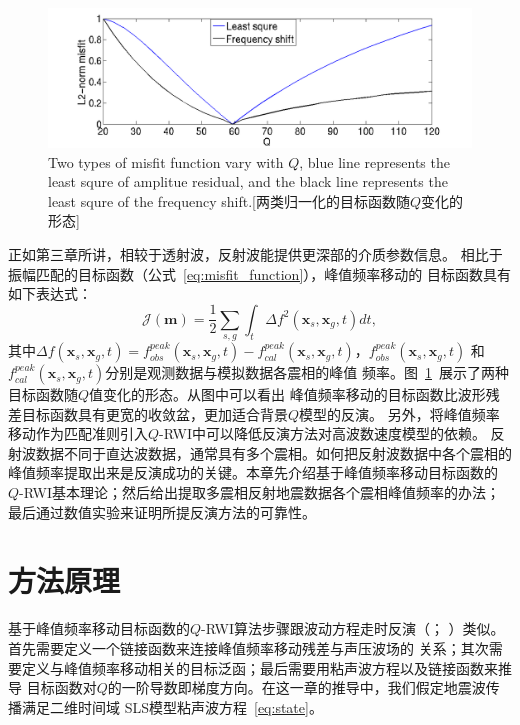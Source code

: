 \begin{figure}[!htbp]
    \centering
    {\includegraphics[width=0.92\linewidth]{figure/misfit_com}}
	{Two types of misfit function vary with $Q$, blue line represents the least 
	squre of amplitue residual, and the black line represents the least squre of 
	the frequency shift.}[两类归一化的目标函数随$Q$变化的形态]
    \label{fig:misfit_com}
\end{figure}
正如第三章所讲，相较于透射波，反射波能提供更深部的介质参数信息。
相比于振幅匹配的目标函数（公式~\ref{eq:misfit_function}），峰值频率移动的
目标函数具有如下表达式：
\begin{equation}
    \mathcal{J}(\mathbf{m})=\frac{1}{2}\sum_{s,g}\int_t\Delta f^2(\mathbf{x}_s,\mathbf{x}_g,t)dt,
    \label{eq:freq_misfit_function}
\end{equation}
其中$\Delta f(\mathbf{x}_s,\mathbf{x}_g,t)=f^{peak}_{obs}(\mathbf{x}_s,\mathbf{x}_g,t)-
f^{peak}_{cal}(\mathbf{x}_s,\mathbf{x}_g,t)$，$f^{peak}_{obs}(\mathbf{x}_s,\mathbf{x}_g,t)$
和$f^{peak}_{cal}(\mathbf{x}_s,\mathbf{x}_g,t)$分别是观测数据与模拟数据各震相的峰值
频率。图~\ref{fig:misfit_com}~展示了两种目标函数随$Q$值变化的形态。从图中可以看出
峰值频率移动的目标函数比波形残差目标函数具有更宽的收敛盆，更加适合背景$Q$模型的反演。
另外，将峰值频率移动作为匹配准则引入$Q$-RWI中可以降低反演方法对高波数速度模型的依赖。
反射波数据不同于直达波数据，通常具有多个震相。如何把反射波数据中各个震相的
峰值频率提取出来是反演成功的关键。本章先介绍基于峰值频率移动目标函数的
$Q$-RWI基本理论；然后给出提取多震相反射地震数据各个震相峰值频率的办法；
最后通过数值实验来证明所提反演方法的可靠性。


\vspace{1.5cm}
\section{方法原理}
\vspace{0.5cm}
基于峰值频率移动目标函数的$Q$-RWI算法步骤跟波动方程走时反演（；
）类似。首先需要定义一个链接函数来连接峰值频率移动残差与声压波场的
关系；其次需要定义与峰值频率移动相关的目标泛函；最后需要用粘声波方程以及链接函数来推导
目标函数对$Q$的一阶导数即梯度方向。在这一章的推导中，我们假定地震波传播满足二维时间域
SLS模型粘声波方程~\ref{eq:state}。

